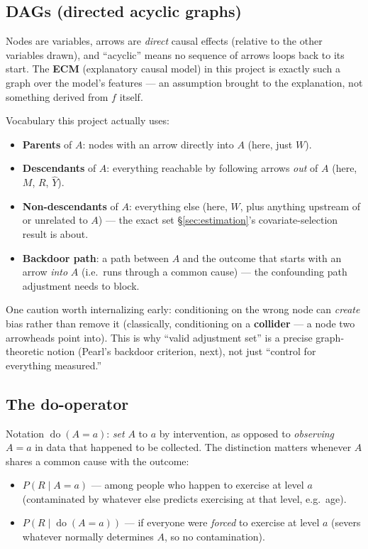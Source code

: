 \subsection{DAGs (directed acyclic graphs)}

Nodes are variables, arrows are \emph{direct} causal effects (relative to
the other variables drawn), and ``acyclic'' means no sequence of arrows
loops back to its start. The \textbf{ECM} (explanatory causal model) in this
project is exactly such a graph over the model's features --- an assumption
brought to the explanation, not something derived from $f$ itself.

Vocabulary this project actually uses:
\begin{itemize}
  \item \textbf{Parents} of $A$: nodes with an arrow directly into $A$
    (here, just $W$).
  \item \textbf{Descendants} of $A$: everything reachable by following
    arrows \emph{out} of $A$ (here, $M$, $R$, $\hat Y$).
  \item \textbf{Non-descendants} of $A$: everything else (here, $W$, plus
    anything upstream of or unrelated to $A$) --- the exact set
    \S\ref{sec:estimation}'s covariate-selection result is about.
  \item \textbf{Backdoor path}: a path between $A$ and the outcome that
    starts with an arrow \emph{into} $A$ (i.e.\ runs through a common
    cause) --- the confounding path adjustment needs to block.
\end{itemize}

One caution worth internalizing early: conditioning on the wrong node can
\emph{create} bias rather than remove it (classically, conditioning on a
\textbf{collider} --- a node two arrowheads point into). This is why ``valid
adjustment set'' is a precise graph-theoretic notion (Pearl's backdoor
criterion, next), not just ``control for everything measured.''

\subsection{The do-operator}

Notation $\operatorname{do}(A=a)$: \emph{set} $A$ to $a$ by intervention, as
opposed to \emph{observing} $A=a$ in data that happened to be collected.
The distinction matters whenever $A$ shares a common cause with the outcome:

\begin{itemize}
  \item $P(R \mid A=a)$ --- among people who happen to exercise at level
    $a$ (contaminated by whatever else predicts exercising at that level,
    e.g.\ age).
  \item $P(R \mid \operatorname{do}(A=a))$ --- if everyone were \emph{forced}
    to exercise at level $a$ (severs whatever normally determines $A$, so no
    contamination).
\end{itemize}

